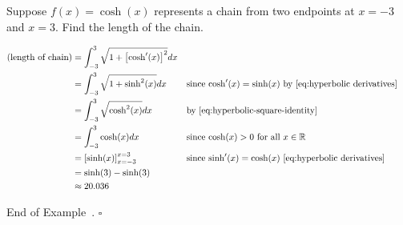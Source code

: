 \documentclass[10pt]{article}
\theoremstyle{definition}
\newtheorem{example}[theorem]{Example}
\renewenvironment{example}
{\begin{oldexample}}
  {\par\smallskip\hfill   End of Example~\theexample. $\square$    \par\end{oldexample}}
\newcommand{\1}[1]{\textbf{1}_{\left[#1\right]}} %
\def\R{\mathbb{R}} %
\begin{document}
\begin{example}[Arc length]
  \label{ex:arc-length-sinh}
  Suppose $f(x)=\cosh(x)$ represents a chain from two endpoints at $x=-3$ and
  $x=3$. Find the length of the chain.

  \begin{center}


  \end{center}

  \begin{align*}
    (\text{length of chain}) 
    &= \int_{-3}^{3}\sqrt{1+ \left[\cosh'(x) \right]^{2} }dx\\
    &= \int_{-3}^{3}\sqrt{1+ \sinh^{2}(x) }dx &&\text{since $\cosh'(x)=\sinh(x)$ by \cref{eq:hyperbolic derivatives} }\\
    &= \int_{-3}^{3}\sqrt{\cosh^{2}(x) }dx &&\text{by \cref{eq:hyperbolic-square-identity} }\\
    &= \int_{-3}^{3}\cosh(x) dx &&\text{since $\cosh(x)>0$ for all $x\in \R$}\\
    &= \left[ \sinh(x) \right]_{x=-3}^{x=3}  &&\text{since $\sinh'(x)=\cosh(x)$ \cref{eq:hyperbolic derivatives}}\\
    &= \sinh(3) - \sinh(3)\\
    &\approx 20.036
\end{align*}


  


\end{example}
\end{document}

